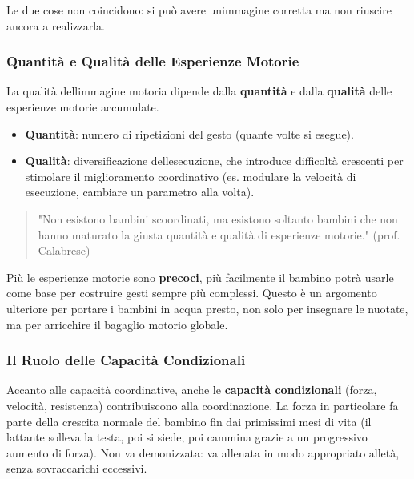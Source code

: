 \documentclass[a4paper,11pt]{article}
\providecommand{\tightlist}{%
  \setlength{\itemsep}{0pt}\setlength{\parskip}{0pt}}
\begin{document}
Le due cose non coincidono: si può avere un\textquotesingle immagine
corretta ma non riuscire ancora a realizzarla.

\subsubsection{Quantità e Qualità delle Esperienze
      Motorie}\label{quantituxe0-e-qualituxe0-delle-esperienze-motorie}

La qualità dell\textquotesingle immagine motoria dipende dalla
\textbf{quantità} e dalla \textbf{qualità} delle esperienze motorie
accumulate.

\begin{itemize}
      \tightlist
      \item
            \textbf{Quantità}: numero di ripetizioni del gesto (quante volte si
            esegue).
      \item
            \textbf{Qualità}: diversificazione dell\textquotesingle esecuzione,
            che introduce difficoltà crescenti per stimolare il miglioramento
            coordinativo (es. modulare la velocità di esecuzione, cambiare un
            parametro alla volta).
\end{itemize}

\begin{quote}
      "Non esistono bambini scoordinati, ma esistono soltanto bambini che non
      hanno maturato la giusta quantità e qualità di esperienze motorie."
      (prof. Calabrese)
\end{quote}

Più le esperienze motorie sono \textbf{precoci}, più facilmente il
bambino potrà usarle come base per costruire gesti sempre più complessi.
Questo è un argomento ulteriore per portare i bambini in acqua presto,
non solo per insegnare le nuotate, ma per arricchire il bagaglio motorio
globale.

\subsubsection{Il Ruolo delle Capacità
      Condizionali}\label{il-ruolo-delle-capacituxe0-condizionali}

Accanto alle capacità coordinative, anche le \textbf{capacità
      condizionali} (forza, velocità, resistenza) contribuiscono alla
coordinazione. La forza in particolare fa parte della crescita normale
del bambino fin dai primissimi mesi di vita (il lattante solleva la
testa, poi si siede, poi cammina grazie a un progressivo aumento di
forza). Non va demonizzata: va allenata in modo appropriato
all\textquotesingle età, senza sovraccarichi eccessivi.
\end{document}
